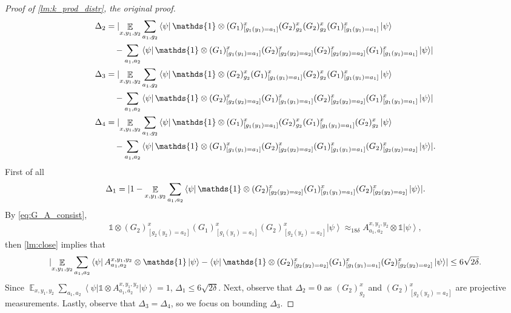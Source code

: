\documentclass[10pt,a4paper]{article}
\theoremstyle{plain}
\theoremstyle{definition}
\DeclarePairedDelimiter{\abs}{\lvert}{\rvert}
\newcommand {\bra} [1] {\ensuremath{ \left\langle #1 \right| }}
\newcommand {\ket} [1] {\ensuremath{ \left| #1 \right\rangle }}
\DeclareMathOperator*{\bigE}{\mathbb{E}}
\newcommand {\id} {\ensuremath{\mathds{1}}}
\newcommand{\x}{\otimes}
\newcommand{\appd}[1]{\approx_{#1}}
\newcommand{\1}{\mathbb{1}} %
\begin{document}
\begin{proof}[Proof of \cref{lm:k_prod_distr}, the original proof]
\begin{align*}
		\Delta_2 &= \abs{ 
		\bigE_{x,y_1,y_2} \sum_{a_1, g_2}
		\bra{\psi} \id \x (G_1)^x_{[g_1(y_1) = a_1]} (G_2)^x_{g_2}  (G_2)^x_{g_2}  (G_1)^x_{[g_1(y_1) = a_1]}  \ket{\psi} \\ 
		&\quad -
		 \sum_{a_1, a_2} \bra{\psi}  
		 \id \x (G_1)^x_{[g_1(y_1) = a_1]}(G_2)^x_{[g_2(y_2) = a_2]} (G_2)^x_{[g_2(y_2) = a_2]} (G_1)^x_{[g_1(y_1) = a_1]}  \ket{\psi}} \\
		\Delta_3 &=\abs{\bigE_{x,y_1,y_2} \sum_{a_1, g_2}
		\bra{\psi}  \id \x (G_2)^x_{g_2} (G_1)^x_{[g_1(y_1) = a_1]}   (G_2)^x_{g_2}  (G_1)^x_{[g_1(y_1) = a_1]}  \ket{\psi} \\ 
		&\quad -
		 \sum_{a_1, a_2} \bra{\psi}  \id \x
		(G_2)^x_{[g_2(y_2) = a_2]} (G_1)^x_{[g_1(y_1) = a_1]}  (G_2)^x_{[g_2(y_2) = a_2]} (G_1)^x_{[g_1(y_1) = a_1]}  \ket{\psi}} \\
		\Delta_4 &=\abs{\bigE_{x,y_1,y_2} \sum_{a_1, g_2}
		\bra{\psi}  \id \x (G_1)^x_{[g_1(y_1) = a_1]}   (G_2)^x_{g_2}  (G_1)^x_{[g_1(y_1) = a_1]} (G_2)^x_{g_2} \ket{\psi} \\ 
		&\quad -
		 \sum_{a_1, a_2} \bra{\psi}  \id \x
		 (G_1)^x_{[g_1(y_1) = a_1]}  (G_2)^x_{[g_2(y_2) = a_2]} (G_1)^x_{[g_1(y_1) = a_1]} (G_2)^x_{[g_2(y_2) = a_2]}  \ket{\psi}}	.
	\end{align*}
	First of all
	\begin{align*}
		\Delta_1 = \abs{ 1 - \bigE_{x,y_1,y_2} \sum_{a_1,a_2}
		\bra{\psi}  \id \x (G_2)^x_{[g_2(y_2) = a_2]} 
		(G_1)^x_{[g_1(y_1) = a_1]} (G_2)^x_{[g_2(y_2) = a_2]}  \ket{\psi}}.
	\end{align*}
	By \cref{eq:G_A_consist},
	\begin{align*}
		\id \x (G_2)^x_{[g_2(y_2) = a_2]} 
		(G_1)^x_{[g_1(y_1) = a_1]} (G_2)^x_{[g_2(y_2) = a_2]}  \ket{\psi}
		\appd{ 18 \delta}  A^{x,y_1,y_2}_{a_1,a_2} \x \id \ket{\psi},
	\end{align*}
	then \cref{lm:close} implies that 
	\begin{align*}
		\abs{ \bigE_{x,y_1,y_2} \sum_{a_1, a_2} \bra{\psi}  A^{x,y_1,y_2}_{a_1,a_2} \x \id \ket{\psi} - \bra{\psi} \id \x (G_2)^x_{[g_2(y_2) = a_2]} 
		(G_1)^x_{[g_1(y_1) = a_1]} (G_2)^x_{[g_2(y_2) = a_2]} \ket{\psi} } \leq 6\sqrt{2\delta}.
	\end{align*}
	Since $\bigE_{x,y_1,y_2} \sum_{a_1, a_2} \bra{\psi} \id \x A^{x,y_1,y_2}_{a_1,a_2} \ket{\psi} = 1$, 
	$\Delta_1 \leq 6\sqrt{2\delta}$.
	Next, observe that $\Delta_2 = 0$ as $(G_2)^x_{g_2}$ and $(G_2)^x_{[g_2(y_2)= a_2]}$ are projective measurements.
	Lastly, observe that $\Delta_3 = \Delta_4$, so we focus on bounding $\Delta_3$.

\end{proof}
\end{document}
